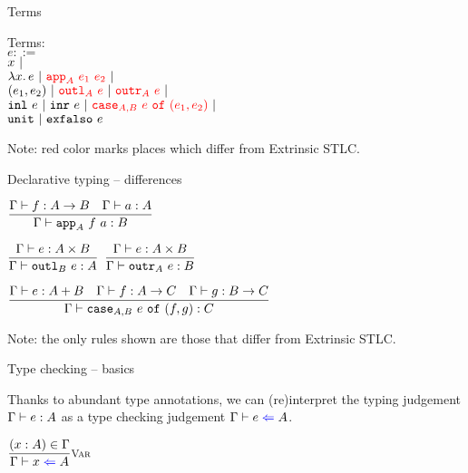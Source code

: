 \documentclass{beamer}
\begin{document}
\begin{frame}{Terms}

Terms: \\
$e ::=$ \\
\qquad $x \ |\ $ \\
\qquad $\fun{x}{e} \pipe \termdiff{\iapp{A}{e_1}{e_2}} \pipe$ \\
\qquad $\pair{e_1}{e_2} \pipe \termdiff{\ioutl{A}{e}} \pipe \termdiff{\ioutr{A}{e}} \pipe$ \\
\qquad $\inl{e} \pipe \inr{e} \pipe \termdiff{\icase{A}{B}{e}{e_1}{e_2}} \pipe$ \\
\qquad $\texttt{unit} \ |\  \texttt{exfalso}\ e$

\vspace{2em}

Note: red color marks places which differ from Extrinsic STLC.

\end{frame}

\begin{frame}{Declarative typing -- differences}

\begin{center}
  $\displaystyle \frac{\Gamma \vdash f : A \to B \quad \Gamma \vdash a : A}{\Gamma \vdash \texttt{app}_{A}\ f\ a : B} \textsc{\footnotesize{}}$

  \vspace{2em}

  $\displaystyle \frac{\Gamma \vdash e : A \times B}{\Gamma \vdash \texttt{outl}_{B}\ e : A} \textsc{\footnotesize{}}$ \quad
  $\displaystyle \frac{\Gamma \vdash e : A \times B}{\Gamma \vdash \texttt{outr}_{A}\ e : B} \textsc{\footnotesize{}}$ \quad

  \vspace{2em}

  $\displaystyle \frac{\Gamma \vdash e : A + B \quad \Gamma \vdash f : A \to C \quad \Gamma \vdash g : B \to C}{\Gamma \vdash \texttt{case}_{A, B}\ e\ \texttt{of}\ (f, g) : C} \textsc{\footnotesize{}}$
\end{center}

\vspace{2em}

Note: the only rules shown are those that differ from Extrinsic STLC.

\end{frame}

\begin{frame}{Type checking -- basics}

Thanks to abundant type annotations, we can (re)interpret the typing judgement $\Gamma \vdash e : A$ as a type checking judgement $\fullcheck{\Gamma}{e}{A}$.

\vspace{2em}

\begin{center}
  $\infrule[Var]{\sidecond{(x : A) \in \Gamma}}{\check{x}{A}}$
\end{center}

\end{frame}
\end{document}
